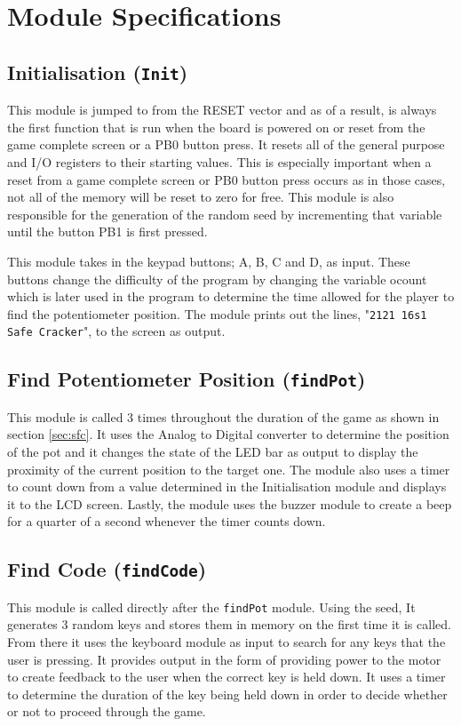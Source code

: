 \documentclass[a4paper]{article}
\begin{document}
\section{Module Specifications}

\subsection{Initialisation (\texttt{Init})}

This module is jumped to from the RESET vector and as of a result, is always the first function that
is run when the board is powered on or reset from the game complete screen or a PB0 button press. It resets all 
of the general purpose and I/O registers to their starting values. This is especially important when a reset 
from a game complete screen or PB0 button press occurs as in those cases, not all of the memory will be reset to 
zero for free. This module is also responsible for the generation of the random seed by incrementing that
variable until the button PB1 is first pressed.

This module takes in the keypad buttons; A, B, C and D, as input. These buttons change the difficulty of the
program by changing the variable ocount which is later used in the program to determine the time allowed for 
the player to find the potentiometer position. The module prints out the lines, "\texttt{2121 16s1 Safe Cracker}", to the screen as output.


\subsection{Find Potentiometer Position (\texttt{findPot})}
This module is called 3 times throughout the duration of the game as shown in section \ref{sec:sfc}. It uses the
Analog to Digital converter to determine the position of the pot and it changes the state of the LED bar as
output to display the proximity of the current position to the target one. The module also uses a timer to count
down from a value determined in the Initialisation module and displays it to the LCD screen. Lastly, the module
uses the buzzer module to create a beep for a quarter of a second whenever the timer counts down.

\subsection{Find Code (\texttt{findCode})}
This module is called directly after the \verb|findPot| module. Using the seed, It generates 3 random keys and 
stores them in memory on the first time it is called. From there it uses the keyboard module as input to search
for any keys that the user is pressing. It provides output in the form of providing power to the motor to
create feedback to the user when the correct key is held down. It uses a timer to determine the duration of
the key being held down in order to decide whether or not to proceed through the game.
\end{document}
